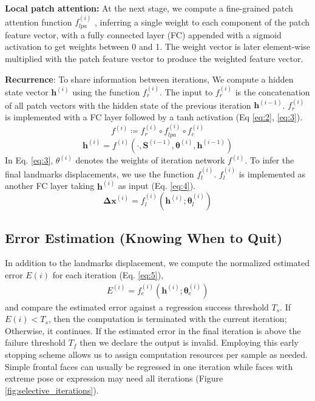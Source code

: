 \documentclass[twocolumn]{article}
\begin{document}
\textbf{Local patch attention:} At the next stage, we compute a fine-grained patch attention function $f_{lpa}^{(i)}$ , inferring a single weight to each component of the patch feature vector, with a fully connected layer (FC) appended with a sigmoid activation to get weights between 0 and 1. The weight vector is later element-wise multiplied with the patch feature vector to produce the weighted feature vector.



\textbf{Recurrence}: To share information between iterations, We compute a hidden state vector $\textbf{h}^{(i)}$ using the function $f_r^{(i)}$. The input to $f_r^{(i)}$ is the concatenation of all patch vectors with the hidden state of the previous iteration $\textbf{h}^{(i-1)}$. $f_r^{(i)}$ is implemented with a FC layer followed by a tanh activation (Eq \ref{eq:2}, \ref{eq:3}).
\begin{equation}
\label{eq:2}
f^{(i)} \coloneq  f_r^{(i)} \circ f_{lpa}^{(i)} \circ f_c^{(i)}
\end{equation}
\begin{equation}
\label{eq:3}
\mathbf{h}^{(i)} = f^{(i)}(\cdot, \mathbf{S}^{(i-1)}, \mathbf{\theta}^{(i)}, \mathbf{h}^{(i-1)})
\end{equation}
In Eq. \ref{eq:3}, $\theta^{(i)}$ denotes the weights of iteration network $f^{(i)}$.
To infer the final landmarks displacements, we use the function $f_l^{(i)}$. $f_l^{(i)}$ is implemented as another FC layer taking $\mathbf{h}^{(i)}$ as input (Eq. \ref{eq:4}). 
\begin{equation}
\label{eq:4}
\mathbf{\Delta x}^{(i)} = f_l^{(i)}(\mathbf{h}^{(i)}; \mathbf{\theta}_l^{(i)})
\end{equation}


\subsection{Error Estimation (Knowing When to Quit)}
In addition to the landmarks displacement, we compute the normalized estimated error $E(i)$ for each iteration (Eq. \ref{eq:5}), 
\begin{gather}
\label{eq:5}
E^{(i)} = f_e^{(i)}(\mathbf{h}^{(i)};  \mathbf{\theta}_e^{(i)})
\end{gather}
and compare the estimated error against a regression success threshold $T_s$. If $E(i) < T_s$, then the computation is terminated with the current iteration; Otherwise, it continues.  If the estimated error in the final iteration is above the failure threshold $T_f$ then we declare the output is invalid. Employing this early stopping scheme allows us to assign computation resources per sample as needed. Simple frontal faces can usually be regressed in one iteration while faces with extreme pose or expression may need all iterations (Figure \ref{fig:selective_iterations}).
\end{document}
